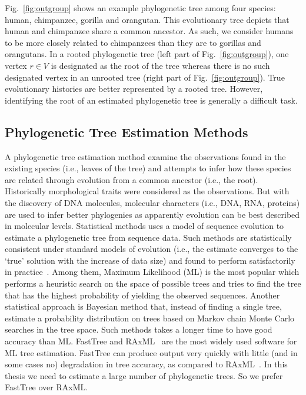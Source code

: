 Fig.~\ref{fig:outgroup} shows an example phylogenetic tree among four species: human, chimpanzee, gorilla and orangutan. This evolutionary tree depicts that human and chimpanzee share a common ancestor. As such, we consider humans to be more closely related to chimpanzees than they are to gorillas and orangutans.
In a rooted phylogenetic tree (left part of Fig.~\ref{fig:outgroup}), one vertex $r \in V$ is designated as the root of the tree whereas there is no such designated vertex in an unrooted tree (right part of Fig.~\ref{fig:outgroup}). True evolutionary histories are better represented by a rooted tree. However, identifying the root of an estimated phylogenetic tree is generally a difficult task.

\subsection{Phylogenetic Tree Estimation Methods}
A phylogenetic tree estimation method examine the observations found in the existing species (i.e., leaves of the tree) and attempts to infer how these species are related through evolution from a common ancestor (i.e., the root). Historically morphological traits were considered as the observations. But with the discovery of DNA molecules, molecular characters (i.e., DNA, RNA, proteins) are used to infer better phylogenies as apparently evolution can be best described in molecular levels. Statistical methods uses a model of sequence evolution to estimate a phylogenetic tree from sequence data. Such methods are statistically consistent under standard models of evolution (i.e., the estimate converges to the `true' solution with the increase of data size) and found to perform satisfactorily in practice~\citep{warnow2017computational}. Among them, Maximum Likelihood (ML) is the most popular which performs a heuristic search on the space of possible trees and tries to find the tree that has the highest probability of yielding the observed sequences. Another statistical approach is Bayesian method that, instead of finding a single tree, estimate a probability distribution on trees  based on Markov chain Monte Carlo searches in the tree space. Such methods takes a longer time to have good accuracy than ML. FastTree\citep{price2010fasttree} and RAxML~\citep{stamatakis2014raxml} are the most widely used software for ML tree estimation. FastTree can produce output very quickly with little (and in some cases no) degradation in tree accuracy, as compared to RAxML~\cite{liu2011raxml}. In this thesis we need to estimate a large number of phylogenetic trees. So we prefer FastTree over RAxML.


